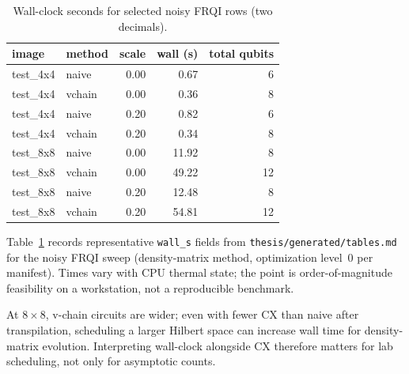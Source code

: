 \begin{table}[htbp]
\centering
\caption{Wall-clock seconds for selected noisy FRQI rows (two decimals).}
\label{tab:wallclock}
\footnotesize
\begin{tabular}{@{}llrrr@{}}
\toprule
image & method & scale & wall (s) & total qubits \\
\midrule
test\_4x4 & naive & 0.00 & 0.67 & 6 \\
test\_4x4 & vchain & 0.00 & 0.36 & 8 \\
test\_4x4 & naive & 0.20 & 0.82 & 6 \\
test\_4x4 & vchain & 0.20 & 0.34 & 8 \\
test\_8x8 & naive & 0.00 & 11.92 & 8 \\
test\_8x8 & vchain & 0.00 & 49.22 & 12 \\
test\_8x8 & naive & 0.20 & 12.48 & 8 \\
test\_8x8 & vchain & 0.20 & 54.81 & 12 \\
\bottomrule
\end{tabular}
\end{table}

Table~\ref{tab:wallclock} records representative \texttt{wall\_s} fields from \texttt{thesis/generated/tables.md} for the noisy FRQI sweep (density-matrix method, optimization level~0 per manifest). Times vary with CPU thermal state; the point is order-of-magnitude feasibility on a workstation, not a reproducible benchmark.

At $8\times8$, v-chain circuits are wider; even with fewer CX than naive after transpilation, scheduling a larger Hilbert space can increase wall time for density-matrix evolution. Interpreting wall-clock alongside CX therefore matters for lab scheduling, not only for asymptotic counts.

